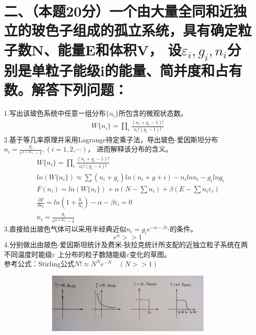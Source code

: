 \documentclass[UTF8]{ctexart}
\begin{document}
\section*{二、（本题20分）一个由大量全同和近独立的玻色子组成的孤立系统，具有确定粒子数N、能量E和体积V，
  设$\varepsilon_i,g_i,n_i$分别是单粒子能级i的能量、简并度和占有数。解答下列问题：}
1.写出该玻色系统中任意一组分布$\{n_i\}$所包含的微观状态数。
\begin{equation*}
  \begin{aligned}
    W\{n_i\}=\prod\limits_i\frac{(n_i+g_i-1)!}{n_i!(g_i-1)!}
  \end{aligned}
\end{equation*}
2.基于等几率原理并采用Lagrange待定乘子法，导出玻色-爱因斯坦分布
$n_i=\frac{g_i}{e^{\alpha+\beta\varepsilon_1}-1},(i=1,2,\cdots)$，
进而解释该分布的含义。
\begin{equation*}
  \begin{aligned}
     & W\{n_i\}=\prod\limits_i\frac{(n_i+g_i-1)!}{n_i!(g_i-1)!}                          \\
     & ln(W\{n_i\})\approx\sum(n_i+g_i)ln(n_i+g+i)-n_ilnn_i-g_ilng_i                     \\
     & F(n_i)=ln(W\{n_i\})+\alpha(N-\sum n_i)+\beta(E-\sum n_i\varepsilon_i)             \\
     & \frac{\partial F}{\partial n_i}=ln(1+\frac{g_i}{n_i})-\alpha-\beta\varepsilon_i=0 \\
     & n_i=\frac{g_i}{e^{\alpha+\beta\varepsilon_i}-1}
  \end{aligned}
\end{equation*}
3.直接给出玻色气体可以采用半经典近似$n_i=g_ie^{-\alpha-\beta\varepsilon_i}$的条件。
\begin{equation*}
  e^\alpha>>1
\end{equation*}
4.分别做出由玻色-爱因斯坦统计及费米-狄拉克统计所支配的近独立粒子系统在两不同温度时能级$\varepsilon$
上分布的粒子数随能级$\varepsilon$变化的草图。\\
参考公式：Stirling公式$N!\approx N^Ne^{-N}\quad(N>>1)$\\
\begin{figure}[H]
  \centering
  \includegraphics[width=12cm,height=3cm]{2_4.jpg}
\end{figure}
\end{document}

